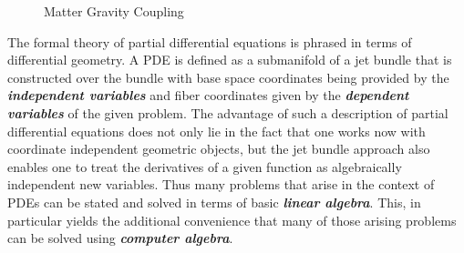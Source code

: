\begin{figure}[hbt!]
\centering 
{}
\caption{Matter Gravity Coupling}\label{MatterGrav}
\end{figure}

The formal theory of partial differential equations is phrased in terms of differential geometry. A PDE is defined as a submanifold of a jet bundle that is constructed over the bundle with base space coordinates being provided by the \textit{\textbf{independent variables}} and fiber coordinates given by the \textit{\textbf{dependent variables}} of the given problem. The advantage of such a description of partial differential equations does not only lie in the fact that one works now with coordinate independent geometric objects, but the jet bundle approach also enables one to treat the derivatives of a given function as algebraically independent new variables. Thus many problems that arise in the context of PDEs can be stated and solved in terms of basic \textit{\textbf{linear algebra}}. This, in particular yields the additional convenience that many of those arising problems can be solved using \textbf{\textit{computer algebra}}.

